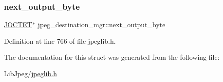 \subsubsection{\texorpdfstring{next\_output\_byte}{next\_output\_byte}}
{\footnotesize\ttfamily \mbox{\hyperlink{jmorecfg_8h_a356ad249f20e691b520da439f92cccbc}{J\+O\+C\+T\+ET}}$\ast$ jpeg\+\_\+destination\+\_\+mgr\+::next\+\_\+output\+\_\+byte}



Definition at line 766 of file jpeglib.\+h.



The documentation for this struct was generated from the following file\+:\begin{DoxyCompactItemize}
\item 
Lib\+Jpeg/\mbox{\hyperlink{jpeglib_8h}{jpeglib.\+h}}\end{DoxyCompactItemize}
